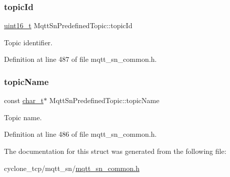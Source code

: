 \subsubsection{\texorpdfstring{topic\+Id}{topicId}}
{\footnotesize\ttfamily \hyperlink{stdint_8h_a273cf69d639a59973b6019625df33e30}{uint16\+\_\+t} Mqtt\+Sn\+Predefined\+Topic\+::topic\+Id}



Topic identifier. 



Definition at line 487 of file mqtt\+\_\+sn\+\_\+common.\+h.

\mbox{\label{structMqttSnPredefinedTopic_a3d49d2c2e35b6fe7825f1f55c40357d9}} 
\subsubsection{\texorpdfstring{topic\+Name}{topicName}}
{\footnotesize\ttfamily const \hyperlink{compiler__port_8h_a40bb5262bf908c328fbcfbe5d29d0201}{char\+\_\+t}$\ast$ Mqtt\+Sn\+Predefined\+Topic\+::topic\+Name}



Topic name. 



Definition at line 486 of file mqtt\+\_\+sn\+\_\+common.\+h.



The documentation for this struct was generated from the following file\+:\begin{DoxyCompactItemize}
\item 
cyclone\+\_\+tcp/mqtt\+\_\+sn/\hyperlink{mqtt__sn__common_8h}{mqtt\+\_\+sn\+\_\+common.\+h}\end{DoxyCompactItemize}
